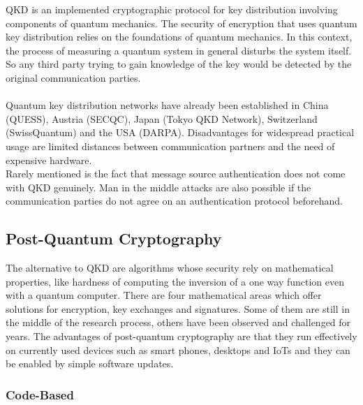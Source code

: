 \documentclass[a4paper,11pt]{article}
\begin{document}
\begin{multicols}{2}
QKD is an implemented cryptographic protocol for key distribution involving components of quantum mechanics. The security of encryption that uses quantum key distribution relies on the foundations of quantum mechanics. In this context, the process of measuring a quantum system in general disturbs the system itself. So any third party trying to gain knowledge of the key would be detected by the original communication parties. \\ 
\\
Quantum key distribution networks have already been established in China (QUESS), Austria (SECQC), Japan (Tokyo QKD Network), Switzerland (SwissQuantum) and the USA (DARPA). 
Disadvantages for widespread practical usage are limited distances between communication partners and the need of expensive hardware. \\
Rarely mentioned is the fact that message source authentication does not come with QKD genuinely. Man in the middle attacks are also possible if the communication parties do not agree on an authentication protocol beforehand.  


\subsection{Post-Quantum Cryptography}

The alternative to QKD are algorithms whose security rely on mathematical properties, like hardness of computing the inversion of a one way function even with a quantum computer. There are four mathematical areas which offer solutions for encryption, key exchanges and signatures. Some of them are still in the middle of the research process, others have been observed and challenged for years. The advantages of post-quantum cryptography are that they run effectively on currently used devices such as smart phones, desktops and IoTs and they can be enabled by simple software updates.

\subsubsection{Code-Based}


\end{multicols}
\end{document}
